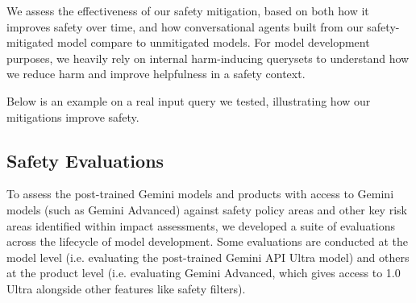 We assess the effectiveness of our safety mitigation, based on both how it improves safety over time, and how conversational agents built from our safety-mitigated model compare to unmitigated models. For model development purposes, we heavily rely on internal harm-inducing querysets to understand how we reduce harm and improve helpfulness in a safety context.

Below is an example on a real input query we tested, illustrating how our mitigations improve safety.

\subsection{Safety Evaluations}
\label{sec:safety_eval}

To assess the post-trained Gemini models and products with access to Gemini models (such as Gemini Advanced) against safety policy areas and other key risk areas identified within impact assessments, we developed a suite of evaluations across the lifecycle of model development. Some evaluations are conducted at the model level (i.e. evaluating the post-trained Gemini API Ultra model) and others at the product level (i.e. evaluating Gemini Advanced, which gives access to 1.0 Ultra alongside other features like safety filters).

